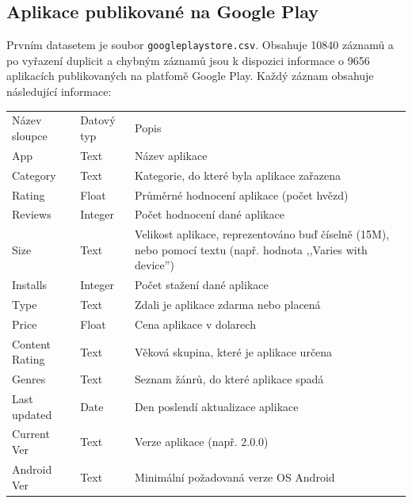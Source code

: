 \documentclass{article}
\begin{document}
\subsection*{Aplikace publikované na Google Play}
Prvním datasetem je soubor \verb|googleplaystore.csv|. Obsahuje 10840 záznamů a po vyřazení 
duplicit a chybným záznamů jsou k dispozici informace o 9656 aplikacích publikovaných na platfomě Google Play.
Každý záznam obsahuje následující informace:

\vspace*{1em}
\noindent \begin{tabularx}{\linewidth}{|l|l|X|}
    \hline
    Název sloupce & Datový typ & Popis                                    \\ \hhline {|=|=|=|}
    App            & Text    & Název aplikace                             \\ \hline
    Category       & Text    & Kategorie, do které byla aplikace zařazena \\ \hline
    Rating         & Float   & Průměrné hodnocení aplikace (počet hvězd)  \\ \hline
    Reviews        & Integer & Počet hodnocení dané aplikace              \\ \hline
    Size           & Text    & Velikost aplikace, reprezentováno buď číselně (15M), nebo pomocí textu (např. hodnota ,,Varies with device'')\\ \hline
    Installs       & Integer & Počet stažení dané aplikace                \\ \hline
    Type           & Text    & Zdali je aplikace zdarma nebo placená      \\ \hline
    Price          & Float   & Cena aplikace v dolarech                   \\ \hline
    Content Rating & Text    & Věková skupina, které je aplikace určena   \\ \hline
    Genres         & Text    & Seznam žánrů, do které aplikace spadá      \\ \hline
    Last updated   & Date    & Den poslendí aktualizace aplikace          \\ \hline
    Current Ver    & Text    & Verze aplikace (např. 2.0.0)               \\ \hline
    Android Ver    & Text    & Minimální požadovaná verze OS Android      \\ \hline
\end{tabularx}
\end{document}
